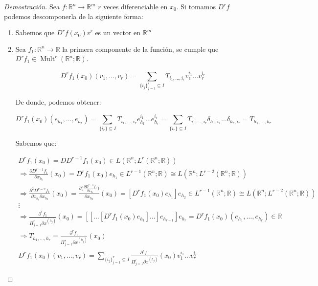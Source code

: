 \begin{proof}[Demostración]
	Sea $f:\mathbb{R}^n \to \mathbb{R}^m$ $r$ veces diferenciable en $x_0$. Si tomamos $D^r f$ podemos descomponerla de la siguiente forma:
	
	\begin{enumerate}
		\item Sabemos que $D^r f(x_0) v^r$ es un vector en $\mathbb{R}^m$
		
		\item Sea $f_1:\mathbb{R}^n\to \mathbb{R} $ la primera componente de la función, se cumple que $D^rf_1 \in \operatorname{Mult}^r(\mathbb{R}^n;\mathbb{R})$.
		
		\begin{equation*}
			D^r f_1(x_0)  (v_1,\dots,v_r) = \sum_{\{i_j\}_{j = 1}^r \subseteq I} T_{i_1,\dots, i_r}v_1^{i_1} \dots  v_r^{i_r}
		\end{equation*}
		
		De donde, podemos obtener:
		
		\begin{equation*}
			D^r f_1(x_0)  (e_{h_1},\dots,e_{h_r} ) =  \sum_{\{i_r\}\subseteq I} 
			T_{i_1,\dots,i_r}e_{h_1}^{i_1}\dots e_{h_r}^{i_r} = \sum_{\{i_r\}\subseteq I} 
			T_{i_1,\dots,i_r}   \delta_{h_1,i_1}\dots\delta_{h_r,i_r} = T_{h_1,\dots,h_r}
		\end{equation*}
		
		
		Sabemos que:
		
		\begin{align*}
			D^rf_1(x_0) = D D^{r-1}f_1(x_0)\in L(\mathbb{R}^n;L^{r}(\mathbb{R}^n;\mathbb{R})) \\
			\Rightarrow \frac{\partial D^{r-1}f_1}{\partial x_{h_i}} (x_0) = D^{r}f_1(x_0)e_{h_1} \in L^{r-1}(\mathbb{R}^n;\mathbb{R}) \cong L(\mathbb{R}^n;L^{r-2}(\mathbb{R}^n;\mathbb{R}))\\
			\Rightarrow \frac{\partial^2 D^{r-2}f_1}{\partial x_{h_i} \partial x_{h_2}} (x_0) =\frac{\partial \bigg(\frac{\partial D^{r-1}f_1}{\partial x_{h_2}}\bigg)}{\partial x_{h_2}} (x_0) = [D^{r}f_1(x_0)e_{h_1}]e_{h_2} \in L^{r-1}(\mathbb{R}^n;\mathbb{R}) \cong L(\mathbb{R}^n;L^{r-2}(\mathbb{R}^n;\mathbb{R}))\\
			\vdots\\
			\Rightarrow \frac{\partial^r f_1}{\Pi_{j = 1}^{r} \partial x^{(h_j)}} (x_0) = [[\dots[D^r f_1(x_0) e_{h_1}]\dots ]e_{h_{r-1}}]e_{h_r}= D^r f_1(x_0) (e_{h_1},\dots, e_{h_r} )   \in \mathbb{R}\\
			\Rightarrow T_{h_1,\dots,h_r} = \frac{\partial^r f_1}{\Pi_{j = 1}^{r} \partial x^{(h_j)}} (x_0)  \\
			D^r f_1(x_0)  (v_1,\dots,v_r) = \sum_{\{i_j\}_{j = 1}^r \subseteq I} \frac{\partial^r f_1}{\Pi_{j = 1}^{r} \partial x^{(h_j)}} (x_0) v_1^{i_1} \dots  v_r^{i_r}
		\end{align*} 
		

\end{enumerate}
\end{proof}
